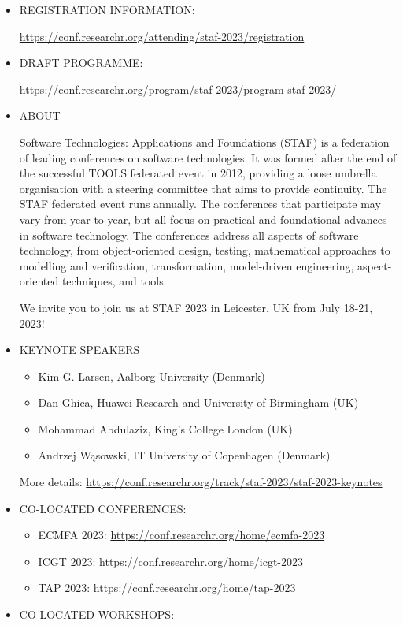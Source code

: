 \documentclass[prodmode,acmtecs]{acmsmall} %
\begin{document}
\begin{itemize}\item  REGISTRATION INFORMATION:  
 
  \href{https://conf.researchr.org/attending/staf-2023/registration}{https://conf.researchr.org/attending/staf-2023/registration} 
 
\item  DRAFT PROGRAMME:  
 
  \href{https://conf.researchr.org/program/staf-2023/program-staf-2023/}{https://conf.researchr.org/program/staf-2023/program-staf-2023/} 
 
\item  ABOUT  
 
  Software Technologies: Applications and Foundations (STAF) is a federation of leading conferences on software technologies. It was formed after the end of the successful TOOLS federated event in 2012, providing a loose umbrella organisation with a steering committee that aims to provide continuity. The STAF federated event runs annually. The conferences that participate may vary from year to year, but all focus on practical and foundational advances in software technology. The conferences address all aspects of software technology, from object-oriented design, testing, mathematical approaches to modelling and verification, transformation, model-driven engineering, aspect-oriented techniques, and tools. 
 
  We invite you to join us at STAF 2023 in Leicester, UK from July 18-21, 2023! 
 
\item  KEYNOTE SPEAKERS 
 
\begin{itemize}\item  Kim G. Larsen, Aalborg University (Denmark)
\item  Dan Ghica, Huawei Research and University of Birmingham (UK)
\item  Mohammad Abdulaziz, King’s College London (UK)
\item  Andrzej Wąsowski, IT University of Copenhagen (Denmark)
\end{itemize} 
  More details: \href{https://conf.researchr.org/track/staf-2023/staf-2023-keynotes}{https://conf.researchr.org/track/staf-2023/staf-2023-keynotes} 
 
\item  CO-LOCATED CONFERENCES: 
 
\begin{itemize}\item  ECMFA 2023: \href{https://conf.researchr.org/home/ecmfa-2023}{https://conf.researchr.org/home/ecmfa-2023}
\item  ICGT 2023: \href{https://conf.researchr.org/home/icgt-2023}{https://conf.researchr.org/home/icgt-2023}
\item  TAP 2023: \href{https://conf.researchr.org/home/tap-2023}{https://conf.researchr.org/home/tap-2023}
\end{itemize} 
\item  CO-LOCATED WORKSHOPS: 
 

\end{itemize}
\end{document}

